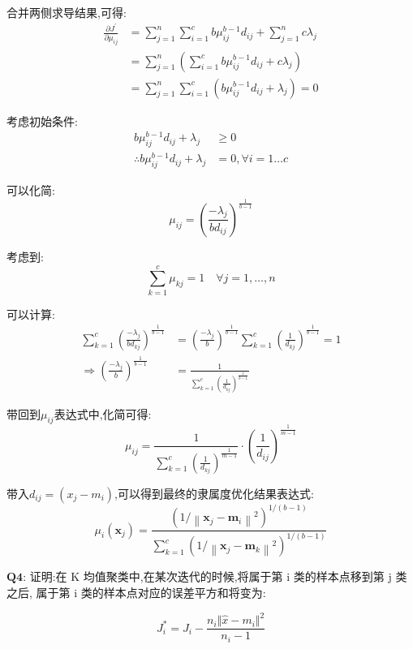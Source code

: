 \documentclass[homework]{IEEEtran}
\begin{document}
\begin{CJK}{UTF8}{gkai}
\begin{align*}
\end{align*} \par
合并两侧求导结果,可得:
\begin{align*}
\frac{\partial J^{\prime}}{\partial \mu_{i j}} &= \sum_{j=1}^{n} \sum_{i=1}^{c} b \mu_{i j}^{b-1} d_{i j} + \sum_{j=1}^{n} c \lambda_{j} \\
        &=\sum_{j=1}^{n}\left(\sum_{i=1}^{c} b \mu_{i j}^{b-1} d_{i j}+c \lambda_{j}\right) \\
        &=\sum_{j=1}^{n}\sum_{i=1}^{c}\left(b \mu_{i j}^{b-1} d_{i j}+\lambda_{j}\right) = 0
\end{align*} \par
考虑初始条件:
\begin{align*}
         b \mu_{i j}^{b-1} d_{i j}+\lambda_{j} &\geq 0 \\
    \therefore b \mu_{i j}^{b-1} d_{i j}+\lambda_{j}&=0, \forall i=1 \dots c
\end{align*} \par
可以化简:
$$
\mu_{i j}=\left(\frac{-\lambda_{j}}{b d_{i j}}\right)^{\frac{1}{b-1}}
$$ \par
考虑到:
$$
\sum_{k=1}^{c} \mu_{k j}=1 \quad \forall j=1, \ldots, n
$$ \par
可以计算:
\begin{align*} 
\sum_{k=1}^{c}\left(\frac{-\lambda_{j}}{b d_{k j}}\right)^{\frac{1}{b-1}} &=\left(\frac{-\lambda_{j}}{b}\right)^{\frac{1}{b-1}} \sum_{k=1}^{c}\left(\frac{1}{d_{k j}}\right)^{\frac{1}{b-1}}=1 \\
\Rightarrow\left(\frac{-\lambda_{j}}{b}\right)^{\frac{1}{b-1}} &=\frac{1}{\sum\limits_{k=1}^{c}\left(\frac{1}{d_{k j}}\right)^{\frac{1}{b-1}}}
\end{align*} \par
带回到$\mu_{ij}$表达式中,化简可得:
$$
\mu_{i j}=\frac{1}{\sum_{k=1}^{c}\left(\frac{1}{d_{k j}}\right)^{\frac{1}{m-1}}} \cdot\left(\frac{1}{d_{i j}}\right)^{\frac{1}{m-1}}
$$ \par
带入$d_{ij}=\left(x_j - m_i\right)$,可以得到最终的隶属度优化结果表达式:
$$
\mu_{i}\left(\mathbf{x}_{j}\right)=\frac{\left(1 / \left\|\mathbf{x}_{j}-\mathbf{m}_{i}\right\|^{2}\right)^{1 /(b-1)}}{\sum\limits_{k=1}^{c}\left(1 /\left\|\mathbf{x}_{j}-\mathbf{m}_{k}\right\|^{2}\right)^{1 /(b-1)}}
$$ \par
$\mathbf{Q4}$: 证明:在 K 均值聚类中,在某次迭代的时候,将属于第 i 类的样本点移到第 j 类之后,
属于第 i 类的样本点对应的误差平方和将变为: \par
$$
J_{i}^{*} = J_i - \frac{n_i \Vert \hat{x}-m_i\Vert^{2}}{n_i - 1}
$$
\end{CJK}
\end{document}
